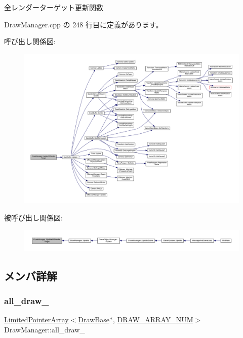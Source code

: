 全レンダーターゲット更新関数 



 Draw\+Manager.\+cpp の 248 行目に定義があります。

呼び出し関係図\+:
\nopagebreak
\begin{figure}[H]
\begin{center}
\leavevmode
\includegraphics[width=350pt]{class_draw_manager_a8eb2f1e3957113ae99e8240c40c89744_cgraph}
\end{center}
\end{figure}
被呼び出し関係図\+:
\nopagebreak
\begin{figure}[H]
\begin{center}
\leavevmode
\includegraphics[width=350pt]{class_draw_manager_a8eb2f1e3957113ae99e8240c40c89744_icgraph}
\end{center}
\end{figure}


\subsection{メンバ詳解}
\mbox{\label{class_draw_manager_a328d73b404a5609d3e89a299362253fd}} 
\subsubsection{\texorpdfstring{all\+\_\+draw\+\_\+}{all\_draw\_}}
{\footnotesize\ttfamily \mbox{\hyperlink{class_limited_pointer_array}{Limited\+Pointer\+Array}}$<$\mbox{\hyperlink{class_draw_base}{Draw\+Base}}$\ast$, \mbox{\hyperlink{class_draw_manager_ad4326cddcb1cc4cec198c4f8069b81f0}{D\+R\+A\+W\+\_\+\+A\+R\+R\+A\+Y\+\_\+\+N\+UM}}$>$ Draw\+Manager\+::all\+\_\+draw\+\_\+\hspace{0.3cm}{\ttfamily [private]}}



